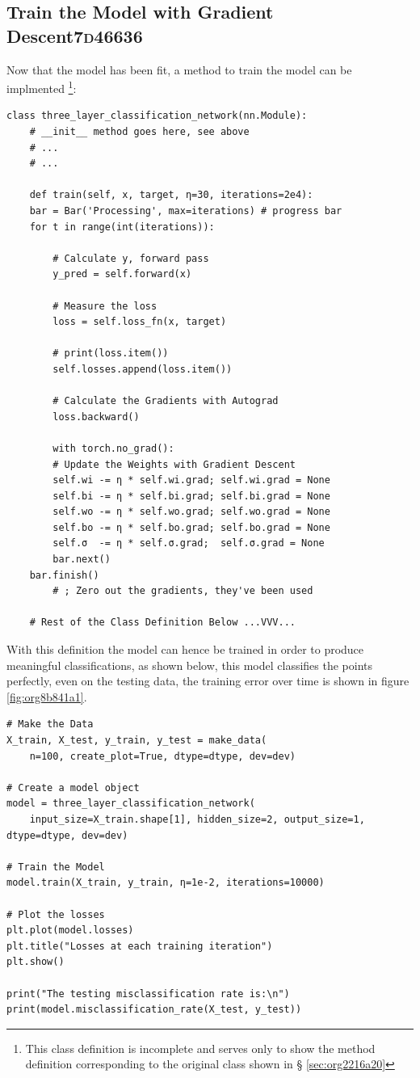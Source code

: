 \documentclass[a4paper,11pt,twoside]{article}
\begin{document}
\subsection{Train the Model with Gradient Descent\hfill{}\textsc{7d46636}}
\label{sec:org59493b4}
Now that the model has been fit, a method to train the model can be
implmented \footnote{This class definition is incomplete and serves only to show the
method definition corresponding to the original class shown in \S
\ref{sec:org2216a20}}:
\begin{verbatim}
class three_layer_classification_network(nn.Module):
    # __init__ method goes here, see above
    # ...
    # ...

    def train(self, x, target, η=30, iterations=2e4):
	bar = Bar('Processing', max=iterations) # progress bar
	for t in range(int(iterations)):

	    # Calculate y, forward pass
	    y_pred = self.forward(x)

	    # Measure the loss
	    loss = self.loss_fn(x, target)

	    # print(loss.item())
	    self.losses.append(loss.item())

	    # Calculate the Gradients with Autograd
	    loss.backward()

	    with torch.no_grad():
		# Update the Weights with Gradient Descent 
		self.wi -= η * self.wi.grad; self.wi.grad = None
		self.bi -= η * self.bi.grad; self.bi.grad = None
		self.wo -= η * self.wo.grad; self.wo.grad = None
		self.bo -= η * self.bo.grad; self.bo.grad = None
		self.σ  -= η * self.σ.grad;  self.σ.grad = None
	    bar.next()
	bar.finish()
		# ; Zero out the gradients, they've been used

    # Rest of the Class Definition Below ...VVV...
\end{verbatim}

With this definition the model can hence be trained in order to
produce meaningful classifications, as shown below, this model classifies the
points perfectly, even on the testing data, the training error 
over time is shown in figure \ref{fig:org8b841a1}.

\begin{verbatim}
# Make the Data
X_train, X_test, y_train, y_test = make_data(
    n=100, create_plot=True, dtype=dtype, dev=dev)

# Create a model object
model = three_layer_classification_network(
    input_size=X_train.shape[1], hidden_size=2, output_size=1, dtype=dtype, dev=dev)

# Train the Model
model.train(X_train, y_train, η=1e-2, iterations=10000)

# Plot the losses
plt.plot(model.losses)
plt.title("Losses at each training iteration")
plt.show()

print("The testing misclassification rate is:\n")
print(model.misclassification_rate(X_test, y_test))
\end{verbatim}
\end{document}
